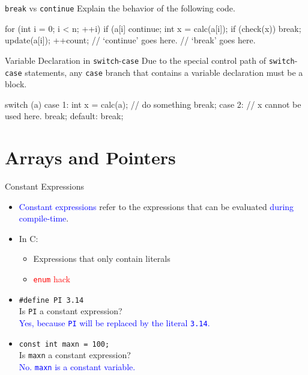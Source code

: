 \documentclass{beamer}
\newcommand{\red}[1]{\textcolor{red}{#1}}
\newcommand{\blue}[1]{\textcolor{blue}{#1}}
\newcommand{\ttt}[1]{\texttt{#1}}
\begin{document}
\begin{frame}[fragile]{\ttt{break} vs \ttt{continue}}
    Explain the behavior of the following code.
    \begin{cpp}
for (int i = 0; i < n; ++i) {
  if (a[i] %
    continue;
  int x = calc(a[i]);
  if (check(x))
    break;
  update(a[i]);
  ++count;
  // `continue' goes here.
}
// `break' goes here.
    \end{cpp}
\end{frame}

\begin{frame}[fragile]{Variable Declaration in \ttt{switch}-\ttt{case}}
    Due to the special control path of \ttt{switch}-\ttt{case} statements, any \ttt{case} branch that contains a variable declaration must be a block.
    \begin{cpp}
switch (a) {
  case 1: {
    int x = calc(a);
    // do something
    break;
  }
  case 2:
    // x cannot be used here.
    break;
  default:
    break;
}
    \end{cpp}
\end{frame}

\section{Arrays and Pointers}

\begin{frame}[fragile]{Constant Expressions}
	\begin{itemize}
		\item \blue{Constant expressions} refer to the expressions that can be evaluated \blue{during compile-time}.
		\item In C:
		\begin{itemize}
			\item Expressions that only contain literals
			\item \red{\ttt{enum} hack}
		\end{itemize}
		\pause
		\item \ttt{\#define PI 3.14}\\
		Is \ttt{PI} a constant expression?\\
		\pause
		\blue{Yes, because \ttt{PI} will be replaced by the literal \ttt{3.14}.}
		\pause
		\item \ttt{const int maxn = 100;}\\
		Is \ttt{maxn} a constant expression?\\
		\pause
		\blue{No. \ttt{maxn} is a constant variable.}
	\end{itemize}
\end{frame}
\end{document}
